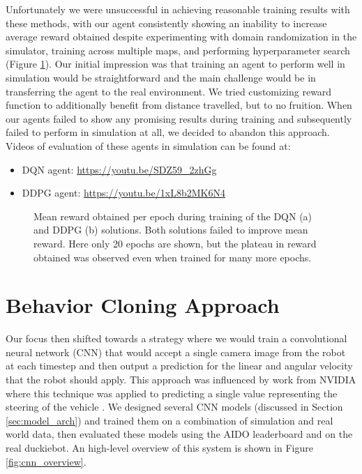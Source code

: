 \documentclass{article}
\begin{document}
Unfortunately we were unsuccessful in achieving reasonable training results with these methods, with our agent consistently showing an inability to increase average reward obtained despite experimenting with domain randomization in the simulator, training across multiple maps, and performing hyperparameter search (Figure \ref{fig:rl_training}). Our initial impression was that training an agent to perform well in simulation would be straightforward and the main challenge would be in transferring the agent to the real environment. We tried customizing reward function to additionally benefit from distance travelled, but to no fruition. When our agents failed to show any promising results during training and subsequently failed to perform in simulation at all, we decided to abandon this approach. Videos of evaluation of these agents in simulation can be found at:
\begin{itemize}
    \item DQN agent: \url{https://youtu.be/SDZ59_2zhGg}
    \item DDPG agent: \url{https://youtu.be/1xL8b2MK6N4}
\end{itemize}

\begin{figure}[H]
\centering
    \qquad
    \caption{Mean reward obtained per epoch during training of the DQN (a) and DDPG (b) solutions. Both solutions failed to improve mean reward. Here only 20 epochs are shown, but the plateau in reward obtained was observed even when trained for many more epochs.}
    \label{fig:rl_training}
\end{figure}

\section{Behavior Cloning Approach}

Our focus then shifted towards a strategy where we would train a convolutional neural network (CNN) that would accept a single camera image from the robot at each timestep and then output a prediction for the linear and angular velocity that the robot should apply. This approach was influenced by work from NVIDIA where this technique was applied to predicting a single value representing the steering of the vehicle \cite{DBLP:journals/corr/BojarskiTDFFGJM16}. We designed several CNN models (discussed in Section \ref{sec:model_arch}) and trained them on a combination of simulation and real world data, then evaluated these models using the AIDO leaderboard and on the real duckiebot. An high-level overview of this system is shown in Figure \ref{fig:cnn_overview}.
\end{document}
